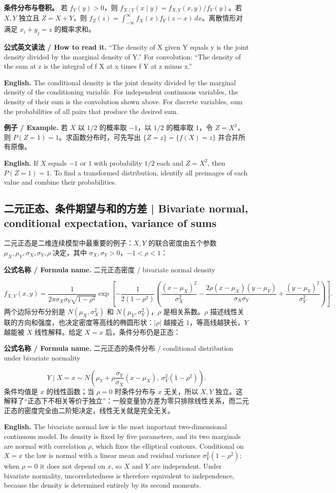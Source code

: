 \documentclass[UTF8,11pt,a4paper]{ctexart}
\newcommand{\EN}[1]{\par\noindent\textbf{English.} #1\par}
\newcommand{\READ}[1]{\par\noindent\textbf{公式英文读法 / How to read it.} #1\par}
\newcommand{\FORMULA}[2]{\par\noindent\textbf{公式名称 / Formula name.} #1 / #2\par}
\newcommand{\EX}[2]{\par\noindent\textbf{例子 / Example.} #1\par\EN{#2}}
\begin{document}
\noindent\textbf{条件分布与卷积。} 若 $f_Y(y)>0$，则 $f_{X\mid Y}(x\mid y)=f_{X,Y}(x,y)/f_Y(y)$。若 $X,Y$ 独立且 $Z=X+Y$，则 $f_Z(z)=\int_{-\infty}^{\infty}f_X(x)f_Y(z-x)\,dx$。离散情形对满足 $x_i+y_j=z$ 的概率求和。
\READ{“The density of X given Y equals y is the joint density divided by the marginal density of Y.” For convolution: “The density of the sum at z is the integral of f X at x times f Y at z minus x.”}
\EN{The conditional density is the joint density divided by the marginal density of the conditioning variable. For independent continuous variables, the density of their sum is the convolution shown above. For discrete variables, sum the probabilities of all pairs that produce the desired sum.}

\EX{若 $X$ 以 $1/2$ 的概率取 $-1$，以 $1/2$ 的概率取 $1$，令 $Z=X^2$，则 $P(Z=1)=1$。求函数分布时，可先写出 $\{Z=z\}=\{f(X)=z\}$ 并合并所有原像。}{If $X$ equals $-1$ or $1$ with probability $1/2$ each and $Z=X^2$, then $P(Z=1)=1$. To find a transformed distribution, identify all preimages of each value and combine their probabilities.}

\subsection{二元正态、条件期望与和的方差 | Bivariate normal, conditional expectation, variance of sums}
\noindent 二元正态是二维连续模型中最重要的例子：$X,Y$ 的联合密度由五个参数 $\mu_X,\mu_Y,\sigma_X,\sigma_Y,\rho$ 决定，其中 $\sigma_X,\sigma_Y>0$，$-1<\rho<1$：
\FORMULA{二元正态密度}{bivariate normal density}
\[
f_{X,Y}(x,y)=\frac{1}{2\pi\sigma_X\sigma_Y\sqrt{1-\rho^2}}
\exp\!\left[-\frac{1}{2(1-\rho^2)}
\left(\frac{(x-\mu_X)^2}{\sigma_X^2}
-\frac{2\rho(x-\mu_X)(y-\mu_Y)}{\sigma_X\sigma_Y}
+\frac{(y-\mu_Y)^2}{\sigma_Y^2}\right)\right].
\]
两个边际分布分别是 $N(\mu_X,\sigma_X^2)$ 和 $N(\mu_Y,\sigma_Y^2)$，$\rho$ 是相关系数。$\rho$ 描述线性关联的方向和强度，也决定密度等高线的椭圆形状：$|\rho|$ 越接近 $1$，等高线越狭长，$Y$ 越能被 $X$ 线性解释。给定 $X=x$ 后，条件分布仍是正态：
\FORMULA{二元正态的条件分布}{conditional distribution under bivariate normality}
\[
Y\mid X=x\sim N\!\left(\mu_Y+\rho\frac{\sigma_Y}{\sigma_X}(x-\mu_X),\ \sigma_Y^2(1-\rho^2)\right).
\]
条件均值是 $x$ 的线性函数；当 $\rho=0$ 时条件分布与 $x$ 无关，所以 $X,Y$ 独立。这解释了“正态下不相关等价于独立”：一般变量协方差为零只排除线性关系，而二元正态的密度完全由二阶矩决定，线性无关就是完全无关。
\EN{The bivariate normal law is the most important two-dimensional continuous model. Its density is fixed by five parameters, and its two marginals are normal with correlation $\rho$, which fixes the elliptical contours. Conditional on $X=x$ the law is normal with a linear mean and residual variance $\sigma_Y^2(1-\rho^2)$; when $\rho=0$ it does not depend on $x$, so $X$ and $Y$ are independent. Under bivariate normality, uncorrelatedness is therefore equivalent to independence, because the density is determined entirely by its second moments.}
\end{document}
